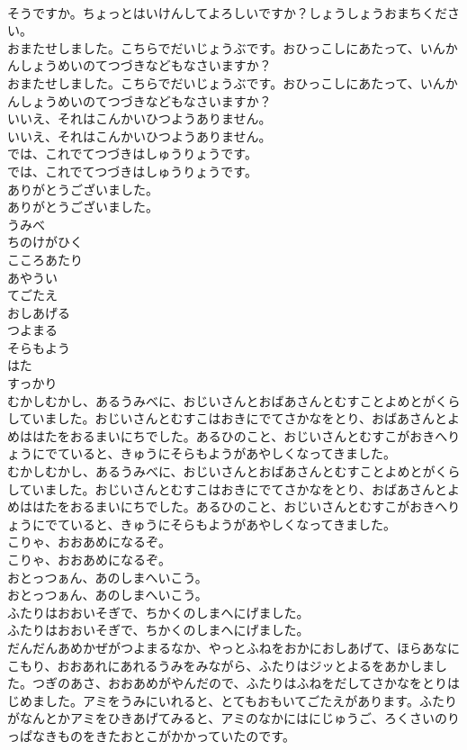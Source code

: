 \documentclass[8pt]{extreport}
\begin{document}
\begin{CJK}{UTF8}{min}
\\	そうですか。ちょっとはいけんしてよろしいですか？しょうしょうおまちください。
\\	おまたせしました。こちらでだいじょうぶです。おひっこしにあたって、いんかんしょうめいのてつづきなどもなさいますか？
\\	おまたせしました。こちらでだいじょうぶです。おひっこしにあたって、いんかんしょうめいのてつづきなどもなさいますか？
\\	いいえ、それはこんかいひつようありません。
\\	いいえ、それはこんかいひつようありません。
\\	では、これでてつづきはしゅうりょうです。
\\	では、これでてつづきはしゅうりょうです。
\\	ありがとうございました。
\\	ありがとうございました。
\\	うみべ
\\	ちのけがひく
\\	こころあたり
\\	あやうい
\\	てごたえ
\\	おしあげる
\\	つよまる
\\	そらもよう
\\	はた
\\	すっかり
\\	むかしむかし、あるうみべに、おじいさんとおばあさんとむすことよめとがくらしていました。おじいさんとむすこはおきにでてさかなをとり、おばあさんとよめははたをおるまいにちでした。あるひのこと、おじいさんとむすこがおきへりょうにでていると、きゅうにそらもようがあやしくなってきました。
\\	むかしむかし、あるうみべに、おじいさんとおばあさんとむすことよめとがくらしていました。おじいさんとむすこはおきにでてさかなをとり、おばあさんとよめははたをおるまいにちでした。あるひのこと、おじいさんとむすこがおきへりょうにでていると、きゅうにそらもようがあやしくなってきました。
\\	こりゃ、おおあめになるぞ。
\\	こりゃ、おおあめになるぞ。
\\	おとっつぁん、あのしまへいこう。
\\	おとっつぁん、あのしまへいこう。
\\	ふたりはおおいそぎで、ちかくのしまへにげました。
\\	ふたりはおおいそぎで、ちかくのしまへにげました。
\\	だんだんあめかぜがつよまるなか、やっとふねをおかにおしあげて、ほらあなにこもり、おおあれにあれるうみをみながら、ふたりはジッとよるをあかしました。つぎのあさ、おおあめがやんだので、ふたりはふねをだしてさかなをとりはじめました。アミをうみにいれると、とてもおもいてごたえがあります。ふたりがなんとかアミをひきあげてみると、アミのなかにはにじゅうご、ろくさいのりっぱなきものをきたおとこがかかっていたのです。

\end{CJK}
\end{document}
